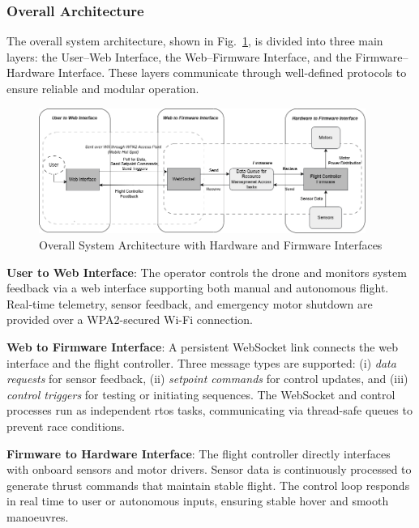 \subsubsection{Overall Architecture}

The overall system architecture, shown in Fig.~\ref{fig:block-overall}, is divided into three main layers: the User–Web Interface, the Web–Firmware Interface, and the Firmware–Hardware Interface. These layers communicate through well-defined protocols to ensure reliable and modular operation.

\begin{figure}[H]
    \centering
    \captionsetup{justification=centering, margin=1cm}
    \includegraphics[width=0.95\textwidth]{img/block-overall-gray.PNG}
    \caption{Overall System Architecture with Hardware and Firmware Interfaces}
    \label{fig:block-overall}
\end{figure}

\textbf{User to Web Interface}: The operator controls the drone and monitors system feedback via a web interface supporting both manual and autonomous flight. Real-time telemetry, sensor feedback, and emergency motor shutdown are provided over a WPA2-secured Wi-Fi connection.

\textbf{Web to Firmware Interface}: A persistent WebSocket link connects the web interface and the flight controller. Three message types are supported: (i) \textit{data requests} for sensor feedback, (ii) \textit{setpoint commands} for control updates, and (iii) \textit{control triggers} for testing or initiating sequences. The WebSocket and control processes run as independent \gls{rtos} tasks, communicating via thread-safe queues to prevent race conditions.

\textbf{Firmware to Hardware Interface}: The flight controller directly interfaces with onboard sensors and motor drivers. Sensor data is continuously processed to generate thrust commands that maintain stable flight. The control loop responds in real time to user or autonomous inputs, ensuring stable hover and smooth manoeuvres.

